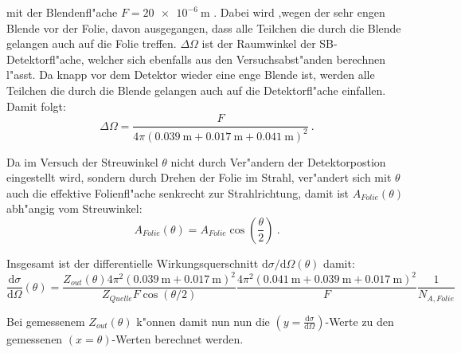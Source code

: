     mit der Blendenfl"ache $F=\SI{20e-6}{\meter}$ \cite{Anleitung}.
    Dabei wird ,wegen der sehr engen Blende vor der Folie, davon ausgegangen, dass alle Teilchen die durch die Blende gelangen auch auf die Folie treffen.
    $\Delta \Omega$ ist der Raumwinkel der SB-Detektorfl"ache, welcher sich ebenfalls aus den Versuchsabst"anden berechnen l"asst. Da knapp vor dem Detektor wieder eine enge Blende ist, werden alle Teilchen die durch die Blende gelangen auch auf die Detektorfl"ache einfallen. Damit folgt:
    \begin{equation}
      \Delta \Omega = \frac{F}{4\pi(\SI{0.039}{\meter}+\SI{0.017}{\meter}+\SI{0.041}{\meter})^2} \: .
    \end{equation}

    Da im Versuch der Streuwinkel $\theta$ nicht durch Ver"andern der Detektorpostion eingestellt wird, sondern durch Drehen der Folie im Strahl, ver"andert sich mit $\theta$ auch die effektive Folienfl"ache senkrecht zur Strahlrichtung, damit ist $A_{Folie}(\theta)$ abh"angig vom Streuwinkel:
    \begin{equation}
      A_{Folie}(\theta) = A_{Folie}\cos\left(\frac{\theta}{2}\right) \:.
    \end{equation}

    Insgesamt ist der differentielle Wirkungsquerschnitt $\text{d}\sigma/\text{d}\Omega(\theta)$ damit:
    \begin{equation}
      \frac{\text{d}\sigma}{\text{d}\Omega}(\theta) =  \frac{Z_{out}(\theta)4\pi^2(\SI{0,039}{\meter}+\SI{0,017}{\meter})^2}{Z_{Quelle}F\cos(\theta/2)}
      \frac{4\pi^2 (\SI{0,041}{\meter}+\SI{0,039}{\meter}+\SI{0.017}{\meter})^2}{F}\frac{1}{N_{A,Folie}}
      \label{querschnitt}
    \end{equation}

    Bei gemessenem $Z_{out}(\theta)$ k"onnen damit nun nun die $(y=\frac{\text{d}\sigma}{\text{d}\Omega})$-Werte zu den gemessenen $(x=\theta)$-Werten berechnet werden.


















    
